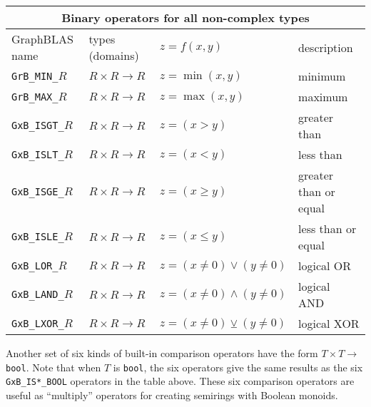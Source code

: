 \documentclass[12pt]{article}
\begin{document}
\vspace{0.2in}
{\footnotesize
\begin{tabular}{|llll|}
\hline
\multicolumn{4}{|c|}{Binary operators for all non-complex types} \\
\hline
GraphBLAS name        & types (domains)            & $z=f(x,y)$      & description \\
\hline
\verb'GrB_MIN_'$R$    & $R \times R \rightarrow R$ & $z = \min(x,y)$ & minimum \\
\verb'GrB_MAX_'$R$    & $R \times R \rightarrow R$ & $z = \max(x,y)$ & maximum \\
\hline
\verb'GxB_ISGT_'$R$   & $R \times R \rightarrow R$ & $z = (x >   y)$ & greater than \\
\verb'GxB_ISLT_'$R$   & $R \times R \rightarrow R$ & $z = (x <   y)$ & less than  \\
\verb'GxB_ISGE_'$R$   & $R \times R \rightarrow R$ & $z = (x \ge y)$ & greater than or equal \\
\verb'GxB_ISLE_'$R$   & $R \times R \rightarrow R$ & $z = (x \le y)$ & less than or equal  \\
\hline
\verb'GxB_LOR_'$R$    & $R \times R \rightarrow R$ & $z = (x \ne 0) \vee    (y \ne 0) $ & logical OR \\
\verb'GxB_LAND_'$R$   & $R \times R \rightarrow R$ & $z = (x \ne 0) \wedge  (y \ne 0) $ & logical AND \\
\verb'GxB_LXOR_'$R$   & $R \times R \rightarrow R$ & $z = (x \ne 0) \veebar (y \ne 0) $ & logical XOR \\
\hline
\end{tabular}
}
\vspace{0.2in}

Another set of six kinds of built-in comparison operators have the form $T
\times T \rightarrow $\verb'bool'.  Note that when $T$ is \verb'bool', the six
operators give the same results as the six \verb'GxB_IS*_BOOL' operators in the
table above.  These six comparison operators are useful as ``multiply''
operators for creating semirings with Boolean monoids.
\end{document}
